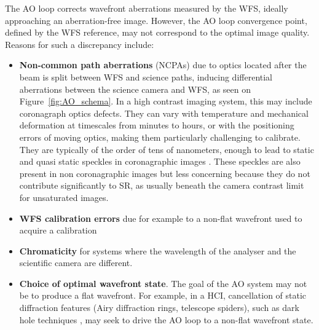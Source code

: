 \documentclass[twocolumn]{aa}
\begin{document}
The AO loop corrects wavefront aberrations measured by the WFS, ideally approaching an aberration-free image. However, the AO loop convergence point, defined by the WFS reference, may not correspond to the optimal image quality. Reasons for such a discrepancy include:
\begin{itemize}
    \item{\textbf{Non-common path aberrations} (NCPAs) due to optics located after the beam is split between WFS and science paths, inducing differential aberrations between the science camera and WFS, as seen on Figure~\ref{fig:AO_schema}.
    In a high contrast imaging system, this may include coronagraph optics defects. They can vary with temperature and mechanical deformation at timescales from minutes to hours, or with the positioning errors of moving optics, making them particularly challenging to calibrate. They are typically of the order of tens of nanometers, enough to lead to static and quasi static speckles in coronagraphic images \citep{sauvage2007, Vigan2019}. These speckles are also present in non coronagraphic images but less concerning because they do not contribute significantly to SR, as usually beneath the camera contrast limit for unsaturated images}. 
    \item{\textbf{WFS calibration errors} due for example to a non-flat wavefront used to acquire a calibration}
    \item{\textbf{Chromaticity} for systems where the wavelength of the analyser and the scientific camera are different.}
    \item{\textbf{Choice of optimal wavefront state}. The goal of the AO system may not be to produce a flat wavefront. For example, in a HCI, cancellation of static diffraction features (Airy diffraction rings, telescope spiders), such as dark hole techniques \citep{Potier2020darkhole}, may seek to drive the AO loop to a non-flat wavefront state.}
\end{itemize}
\end{document}
